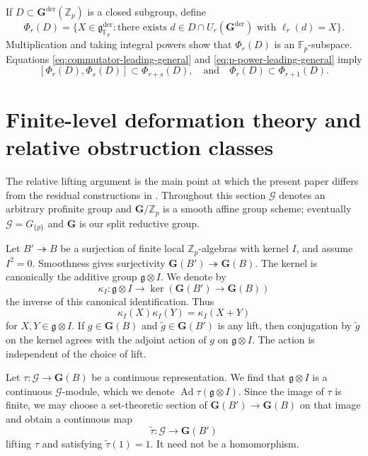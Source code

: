 \documentclass[11pt]{amsart}
\numberwithin{equation}{section}
\newcommand{\Fp}{\mathbb F_p}
\newcommand{\Zp}{\mathbb Z_p}
\newcommand{\Ad}{\operatorname{Ad}}
\newcommand{\frakg}{\mathfrak g}
\newcommand{\GG}{\mathbf G}
\newcommand{\Gder}{\mathbf G^{\mathrm{der}}}
\theoremstyle{definition}
\begin{document}
If $D\subset\Gder(\Zp)$ is a closed subgroup, define
\begin{equation}\label{eq:Phi-general}
 \Phi_r(D)
 =
 \{X\in\frakg^{\mathrm{der}}_{\Fp}:
 \text{there exists }d\in D\cap U_r(\Gder)
 \text{ with }\ell_r(d)=X\}.
\end{equation}
Multiplication and taking integral powers show that
$\Phi_r(D)$ is an $\Fp$-subspace. Equations
\eqref{eq:commutator-leading-general} and
\eqref{eq:p-power-leading-general} imply
\begin{equation}\label{eq:Phi-basic-properties}
 [\Phi_r(D),\Phi_s(D)]\subset\Phi_{r+s}(D),
  \quad\text{and}\quad
 \Phi_r(D)\subset\Phi_{r+1}(D).
\end{equation}


\section{Finite-level deformation theory and relative obstruction classes}
\label{sec:finite-deformation}

The relative lifting argument is the main point at which the present paper
differs from the residual constructions in \cite{Ray2021,Ray2023,Tang2023}.
Throughout this section $\mathcal G$ denotes an arbitrary profinite
group and $\GG/\Zp$ is a smooth affine group scheme; eventually
$\mathcal G=G_{\{p\}}$ and $\GG$ is our split reductive group.

Let $B'\twoheadrightarrow B$ be a surjection of finite local
$\Zp$-algebras with kernel $I$, and assume $I^2=0$.  Smoothness gives
surjectivity $\GG(B')\twoheadrightarrow \GG(B)$.
The kernel is canonically the additive group $\frakg\otimes I$.
We denote by
\[
        \kappa_I:
        \frakg\otimes I
        \longrightarrow
        \ker\!\left(\GG(B')\to\GG(B)\right)
\]
the inverse of this canonical identification. Thus
\[
 \kappa_I(X)\kappa_I(Y)=\kappa_I(X+Y)
\]
for $X,Y\in\frakg\otimes I$. If $g\in\GG(B)$ and $\widetilde g\in\GG(B')$ is any lift, then
conjugation by $\widetilde g$ on the kernel agrees with the adjoint
action of $g$ on $\frakg\otimes I$.  The action is independent of the
choice of lift.

Let $\tau:\mathcal G\longrightarrow\GG(B)$ be a continuous representation. We find that
$\frakg\otimes I$ is a continuous $\mathcal G$-module, which we denote
$\Ad\tau(\frakg\otimes I)$. Since the image of $\tau$ is finite, we
may choose a set-theoretic section of $\GG(B')\to\GG(B)$ on that image
and obtain a continuous map
\[
        \widetilde\tau:\mathcal G\longrightarrow\GG(B')
\]
lifting $\tau$ and satisfying $\widetilde\tau(1)=1$.  It need not be a
homomorphism.
\end{document}
